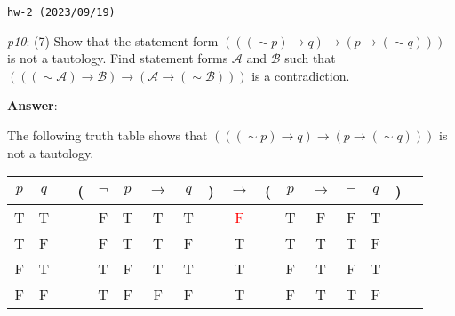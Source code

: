 \documentclass[UTF8,12pt,a4paper]{ctexart}
\newcommand{\negs}{\sim\!}
\begin{document}
\noindent\texttt{hw-2 (2023/09/19)}

\emph{p10}: (7) \quad
Show that the statement form $(((\negs p) \to q)  \to (p \to (\negs q)))$ 
is not a tautology. Find statement forms $\mathscr{A}$ and $\mathscr{B}$ such that 
$(((\negs \mathscr{A}) \to \mathscr{B})  \to (\mathscr{A} \to (\negs \mathscr{B})))$ is a contradiction.

\noindent\textbf{Answer}:

The following truth table shows that $(((\negs p) \to q)  \to (p \to (\negs q)))$ 
is not a tautology.
\begin{center}
	\hspace{8em} 
	\begin{tabular}{@{ }c@{ }@{ }c | c@{ }@{}c@{}@{ }c@{ }@{ }c@{ }@{ }c@{ }@{ }c@{ }@{}c@{}@{ }c@{ }@{}c@{}@{ }c@{ }@{ }c@{ }@{ }c@{ }@{ }c@{ }@{}c@{}@{ }c}
		$p$ & $q$ &  & ( & $\lnot$ & $p$ & $\rightarrow$ & $q$ & ) & $\rightarrow$ & ( & $p$ & $\rightarrow$ & $\lnot$ & $q$ & ) & \\
		\hline 
		T & T &  &  & F & T & T & T &  & \textcolor{red}{F} &  & T & F & F & T &  & \\
		T & F &  &  & F & T & T & F &  & {T} &  & T & T & T & F &  & \\
		F & T &  &  & T & F & T & T &  & {T} &  & F & T & F & T &  & \\
		F & F &  &  & T & F & F & F &  & {T} &  & F & T & T & F &  & \\
	\end{tabular}
\end{center}
\end{document}
